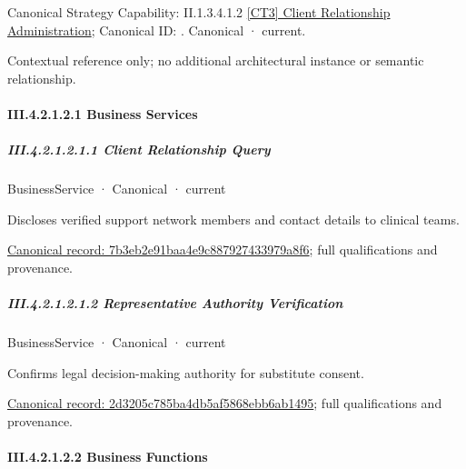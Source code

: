 {\small Canonical Strategy Capability: II.1.3.4.1.2 \hyperref[element:d682c11d3eb04770b1f20be478fd475e]{[CT3] Client Relationship Administration}; Canonical ID: \texttt{}. Canonical · current.}\par
Contextual reference only; no additional architectural instance or semantic relationship.\par
\paragraph*{III.4.2.1.2.1 Business Services}
\label{navigation:III.4.2.1.2.1}

\subparagraph*{III.4.2.1.2.1.1 Client Relationship Query}
\label{navigation:III.4.2.1.2.1.1}

\label{element:7b3eb2e91baa4e9c887927433979a8f6}
{\small BusinessService · Canonical · current}\par

Discloses verified support network members and contact details to clinical teams.


{\footnotesize \href{../../../../../../../continuum/business/business-service/7b3eb2e91baa4e9c887927433979a8f6.md}{Canonical record: 7b3eb2e91baa4e9c887927433979a8f6}; full qualifications and provenance.}\par
\subparagraph*{III.4.2.1.2.1.2 Representative Authority Verification}
\label{navigation:III.4.2.1.2.1.2}

\label{element:2d3205c785ba4db5af5868ebb6ab1495}
{\small BusinessService · Canonical · current}\par

Confirms legal decision-making authority for substitute consent.


{\footnotesize \href{../../../../../../../continuum/business/business-service/2d3205c785ba4db5af5868ebb6ab1495.md}{Canonical record: 2d3205c785ba4db5af5868ebb6ab1495}; full qualifications and provenance.}\par
\paragraph*{III.4.2.1.2.2 Business Functions}
\label{navigation:III.4.2.1.2.2}

